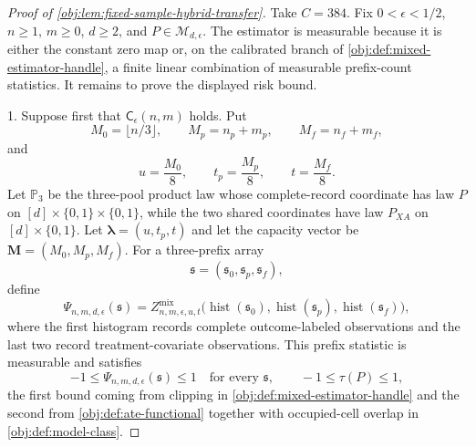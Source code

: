 \begin{proof}[Proof of \cref{obj:lem:fixed-sample-hybrid-transfer}]
Take \(C=384\).  Fix \(0<\epsilon<1/2\), \(n\ge1\), \(m\ge0\), \(d\ge2\), and \(P\in\mathcal M_{d,\epsilon}\).  The estimator is measurable because it is either the constant zero map or, on the calibrated branch of \cref{obj:def:mixed-estimator-handle}, a finite linear combination of measurable prefix-count statistics.  It remains to prove the displayed risk bound. %

1. Suppose first that \(\mathsf C_\epsilon(n,m)\) holds.  Put
\[
M_0=\lfloor n/3\rfloor,\qquad
M_p=n_p+m_p,\qquad
M_f=n_f+m_f,
\]
and
\[
u=\frac{M_0}{8},\qquad t_p=\frac{M_p}{8},\qquad t=\frac{M_f}{8}.
\]
Let \(\mathbb P_3\) be the three-pool product law whose complete-record coordinate has law \(P\) on
\([d]\times\{0,1\}\times\{0,1\}\), while the two shared coordinates have law \(P_{XA}\) on
\([d]\times\{0,1\}\).  Let \(\boldsymbol\lambda=(u,t_p,t)\) and let the capacity vector be
\(\boldsymbol M=(M_0,M_p,M_f)\).  For a three-prefix array
\[
\mathfrak s=(\mathfrak s_0,\mathfrak s_p,\mathfrak s_f),
\]
define
\[
\Psi_{n,m,d,\epsilon}(\mathfrak s)
=
Z^{\mathrm{mix}}_{n,m,\epsilon,u,t}
\bigl(\operatorname{hist}(\mathfrak s_0),
      \operatorname{hist}(\mathfrak s_p),
      \operatorname{hist}(\mathfrak s_f)\bigr),
\]
where the first histogram records complete outcome-labeled observations and the last two record treatment-covariate observations.  This prefix statistic is measurable and satisfies
\[
-1\le \Psi_{n,m,d,\epsilon}(\mathfrak s)\le 1
\quad\text{for every }\mathfrak s,
\qquad
-1\le \tau(P)\le 1,
\]
the first bound coming from clipping in \cref{obj:def:mixed-estimator-handle} and the second from \cref{obj:def:ate-functional} together with occupied-cell overlap in \cref{obj:def:model-class}. %


\end{proof}
